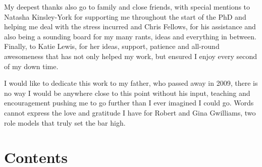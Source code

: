 \documentclass[a4paper,oneside,onecolumn,openright,12pt]{book}
\makeatletter
\def\contentsname{Contents}
\renewcommand\tableofcontents{%
    \if@twocolumn%
      \@restonecoltrue\onecolumn%
    \else%
      \@restonecolfalse%
    \fi%
    \chapter*{\contentsname}%
    \@starttoc{toc}%
    \if@restonecol\twocolumn\fi%
    }
\newcounter{algorithm}[chapter]
\newcommand\listalgorithmsname{List of Algorithms}
\newcommand\listofalgorithms{%
    \if@twocolumn
      \@restonecoltrue\onecolumn
    \else
      \@restonecolfalse
    \fi
    \chapter*{\listalgorithmsname}%
      \@mkboth{\listalgorithmsname}{\listalgorithmsname}%
    \@starttoc{loa}%
    \if@restonecol\twocolumn\fi
    }
\renewcommand\listoffigures{%
    \if@twocolumn
      \@restonecoltrue\onecolumn
    \else
      \@restonecolfalse
    \fi
    \chapter*{\listfigurename}%
      \@mkboth{\listfigurename}{\listfigurename}%
    \@starttoc{lof}%
    \if@restonecol\twocolumn\fi
    }
\renewcommand\listoftables{%
    \if@twocolumn
      \@restonecoltrue\onecolumn
    \else
      \@restonecolfalse
    \fi
    \chapter*{\listtablename}%
      \@mkboth{\listtablename}{\listtablename}%
    \@starttoc{lot}%
    \if@restonecol\twocolumn\fi
    }
\makeatother
\begin{document}
My deepest thanks also go to family and close friends, with special mentions to Natasha Kinsley-York for supporting me throughout the start of the PhD and helping me deal with the stress incurred and Chris Fellows, for his assistance and also being a sounding board for my many rants, ideas and everything in between. Finally, to Katie Lewis, for her ideas, support, patience and all-round awesomeness that has not only helped my work, but ensured I enjoy every second of my down time.

I would like to dedicate this work to my father, who passed away in 2009, there is no way I would be anywhere close to this point without his input, teaching and encouragement pushing me to go further than I ever imagined I could go. Words cannot express the love and gratitude I have for Robert and Gina Gwilliams, two role models that truly set the bar high. 



\tableofcontents



\listoffigures

\listoftables

\lstlistoflistings




\mainmatter












\backmatter
\end{document}
